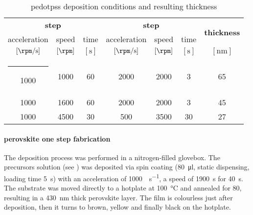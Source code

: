 \begin{table}%
	\caption{\Gls{pedotpss} deposition conditions and resulting thickness}\label{pedotpss_thickness}
	\begin{center}
		\begin{tabular}{c c c | c c c | c}
			\multicolumn{3}{c|}{\textbf{\nth{1} step}} & \multicolumn{3}{c|}{\textbf{\nth{2} step}} & \multirow{2}{*}{\textbf{thickness}}                                                    \\
			acceleration                      & speed                             & time                       & acceleration    & speed     & time    &          \\
			$[\si{\rpm\per\s}]$                  & $[\si{\rpm}]$                         & $[\si{\s}]$                    & $[\si{\rpm\per\s}]$ & $[\si{\rpm}]$ & $[\si{\s}]$ & $[\si{\nm}]$ \\
			\hline
			\rule[0ex]{-4pt}{3ex}
			1000                              & 1000                              & 60                         & 2000            & 2000      & 3       & 65       \\
			1000                              & 1600                              & 60                         & 2000            & 2000      & 3       & 45       \\
			1000                              & 4500                              & 30                         & 500             & 3500      & 30      & 27       \\
		\end{tabular}
	\end{center}
\end{table}

\paragraph{ perovskite one step fabrication}
The deposition process was performed in a nitrogen-filled glovebox.
The precursors solution (see ) was deposited via spin coating (\SI{80}{\ul}, static dispensing, loading time \SI{5}{\s}) with an acceleration of \SI{1000}{\rpm\per\s}, a speed of \SI{1900}{\s} for \SI{40}{\s}. The substrate was moved directly to a hotplate at \SI{100}{\celsius} and annealed for \SI{80}{\min}, resulting in a \SI{430}{\nm} thick perovskite layer. The film is colourless just after deposition, then it turns to brown, yellow and finally black on the hotplate.

\FloatBarrier
